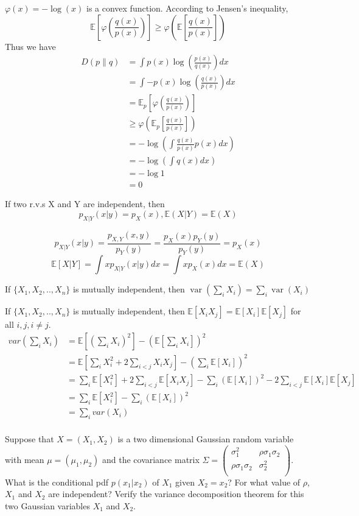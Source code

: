 \documentclass[  11pt]{article}
\newcommand{\Var}{\operatorname{var}}
\begin{document}
\begin{ExerciseList}
\Answer
$\varphi(x)=-\log(x)$ is a convex function.
According to Jensen's inequality,
$$\mathbb{E}[\varphi(\frac{q(x)}{p(x)})] \geq \varphi (\mathbb{E}[\frac{q(x)}{p(x)}])$$
Thus we have
\[
\begin{split}
D(p\|q) &=\int p(x)\log(\frac{p(x)}{q(x)})dx\\
&=\int -p(x) \log(\frac{q(x)}{p(x)})dx\\
&=\mathbb{E}_p[\varphi(\frac{q(x)}{p(x)})]\\
&\geq \varphi (\mathbb{E}_p[\frac{q(x)}{p(x)}])\\
&=-\log(\int\frac{q(x)}{p(x)}p(x)dx)\\
&=-\log(\int q(x)dx)\\
&=-\log1\\
&=0
\end{split}
\]


\Exercise
 If  two r.v.s X and Y are independent, then
\[
p_{X|Y}(x|y)=p_X(x), \mathbb{E}(X|Y)=\mathbb{E}(X)
\]

\Answer 
$$p_{X|Y}(x|y)=\frac{p_{X,Y}(x,y)}{p_Y(y)}=\frac{p_{X}(x)p_Y(y)}{p_Y(y)}=p_X(x)$$
$$\mathbb{E}[X|Y]=\int xp_{X|Y}(x|y)dx=\int xp_X(x)dx= \mathbb{E}(X)$$

\Exercise
If $\{X_1, X_2,.., X_n \}$ is mutually independent, then $\Var(\sum_iX_i)=\sum_i \Var(X_i)$

\Answer
If $\{X_1,X_2,..,X_n \}$ is mutually independent, then $\mathbb{E}[X_i X_j]=\mathbb{E}[X_i]\mathbb{E}[X_j]$ for all $i,j, i\neq j$.
\[
\begin{split}
var(\sum_i{X_i})
&=\mathbb{E}[(\sum_i{X_i})^2]-(\mathbb{E}[\sum_i X_i])^2\\
&=\mathbb{E}[\sum_i X_i^2+2\sum_{i<j}X_iX_j]-(\sum_i \mathbb{E}[X_i])^2\\
&=\sum_i \mathbb{E}[X_i^2]+2\sum_{i<j}\mathbb{E}[X_iX_j]-\sum_i (\mathbb{E}[X_i])^2-2\sum_{i<j}\mathbb{E}[X_i]\mathbb{E}[X_j]\\
&=\sum_i \mathbb{E}[X_i^2]-\sum_i (\mathbb{E}[X_i])^2\\
&=\sum_i var(X_i)\\
\end{split}
\]

\Exercise 

Suppose that $X=(X_1, X_2)$ is a two dimensional Gaussian random variable with mean $\mu=(\mu_1, \mu_2) $ and the covariance matrix $\Sigma=\left(
  \begin{array}{cc}
    \sigma_1^2 & \rho\sigma_1\sigma_2  \\
    \rho\sigma_1\sigma_2 & \sigma_2^2 \\
  \end{array}
\right) $. What is the conditional pdf $p(x_1|x_2)$ of $X_1$ given $X_2=x_2$? For what value of $\rho$, $X_1$
and $X_2$ are independent? Verify the variance decomposition theorem for this two Gaussian variables $X_1$ and $X_2$.


\end{ExerciseList}
\end{document}
